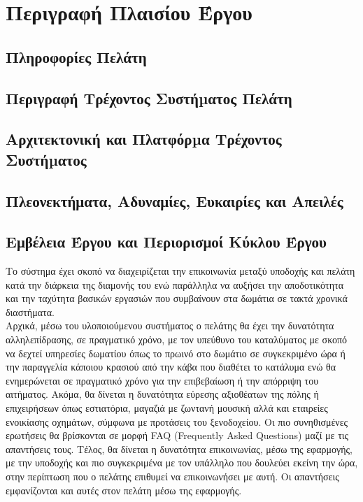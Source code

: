 \section{Περιγραφή Πλαισίου Έργου}

	\subsection{Πληροφορίες Πελάτη}
	\subsection{Περιγραφή Τρέχοντος Συστήµατος Πελάτη}
	\subsection{Αρχιτεκτονική και Πλατφόρµα Τρέχοντος Συστήµατος}
	\subsection{Πλεονεκτήματα, Αδυναμίες, Ευκαιρίες και Απειλές}
	
	\newpage
	\subsection{Εμβέλεια Έργου και Περιορισμοί Κύκλου Έργου}
		
		\noindent
		Το σύστημα έχει σκοπό να διαχειρίζεται την επικοινωνία μεταξύ υποδοχής και πελάτη κατά την διάρκεια της διαμονής του ενώ παράλληλα να αυξήσει την αποδοτικότητα και την ταχύτητα βασικών εργασιών που συμβαίνουν στα δωμάτια σε τακτά χρονικά διαστήματα.\\
		
		\noindent
		Αρχικά, μέσω του υλοποιούμενου συστήματος ο πελάτης θα έχει την δυνατότητα αλληλεπίδρασης, σε πραγματικό χρόνο, με τον υπεύθυνο του καταλύματος με σκοπό να δεχτεί υπηρεσίες δωματίου όπως το πρωινό στο δωμάτιο σε συγκεκριμένο ώρα ή την παραγγελία κάποιου κρασιού από την κάβα που διαθέτει το κατάλυμα ενώ θα ενημερώνεται σε πραγματικό χρόνο για την επιβεβαίωση ή την απόρριψη του αιτήματος. Ακόμα, θα δίνεται η δυνατότητα εύρεσης αξιοθέατων της πόλης ή επιχειρήσεων όπως εστιατόρια, μαγαζιά με ζωντανή μουσική αλλά και εταιρείες ενοικίασης οχημάτων, σύμφωνα με προτάσεις του ξενοδοχείου. Οι πιο συνηθισμένες ερωτήσεις θα βρίσκονται σε μορφή FAQ (Frequently Asked Questions) μαζί με τις απαντήσεις τους. Τέλος, θα δίνεται η δυνατότητα επικοινωνίας, μέσω της εφαρμογής, με την υποδοχής και πιο συγκεκριμένα με τον υπάλληλο που δουλεύει εκείνη την ώρα, στην περίπτωση που ο πελάτης επιθυμεί να επικοινωνήσει με αυτή. Οι απαντήσεις εμφανίζονται και αυτές στον πελάτη μέσω της εφαρμογής. \\
		

